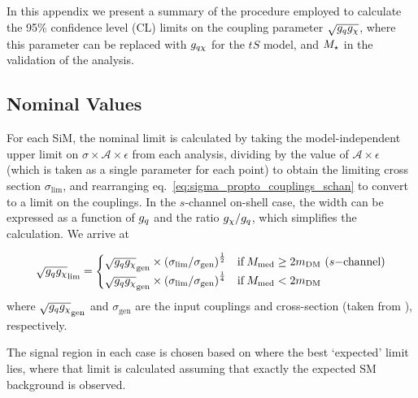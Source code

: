 In this appendix we present a summary of the procedure employed to calculate the 95\% confidence level (CL) limits on the coupling parameter $\sqrt{g_q g_{\chi}}$, where this parameter can be replaced with $g_{q \chi}$ for the $tS$ model, and $M_{\star}$ in the validation of the \monojet analysis.

\subsection{Nominal Values}
For each SiM, the nominal limit is calculated by taking the model-independent upper limit on $\sigma \times \mathcal{A} \times \epsilon$ from each analysis, dividing by the value of $\mathcal{A} \times \epsilon$ (which is taken as a single parameter for each point) to obtain the limiting cross section $\sigma_{\mathrm{lim}}$, and rearranging eq.~\ref{eq:sigma_propto_couplings_schan} to convert to a limit on the couplings. In the $s$-channel on-shell case, the width can be expressed as a function of $g_q$ and the ratio $g_{\chi} / g_q$, which simplifies the calculation. We arrive at

\begin{equation}
  \sqrt{g_q g_{\chi}}_{\mathrm{lim}} =
  \begin{cases}
      \sqrt{g_q g_{\chi}}_{\mathrm{gen}} \times \left( \sigma_{\mathrm{lim}} / \sigma_{\mathrm{gen}} \right)^{\frac{1}{2}} & \mathrm{ if } \, M_{\mathrm{med}} \geq 2 m_{\mathrm{DM}} \,\, (s\mathrm{-channel})\\
      \sqrt{g_q g_{\chi}}_{\mathrm{gen}} \times \left( \sigma_{\mathrm{lim}} / \sigma_{\mathrm{gen}} \right)^{\frac{1}{4}} & \mathrm{ if } \, M_{\mathrm{med}} < 2 m_{\mathrm{DM}} \\
  \end{cases}
  \label{eq:nominal_limit}
\end{equation}
where $\sqrt{g_q g_{\chi}}_{\mathrm{gen}}$ and $\sigma_{\mathrm{gen}}$ are the input couplings and cross-section (taken from \PYTHIA), respectively.

The signal region in each case is chosen based on where the best `expected' limit lies, where that limit is calculated assuming that exactly the expected SM background is observed.




